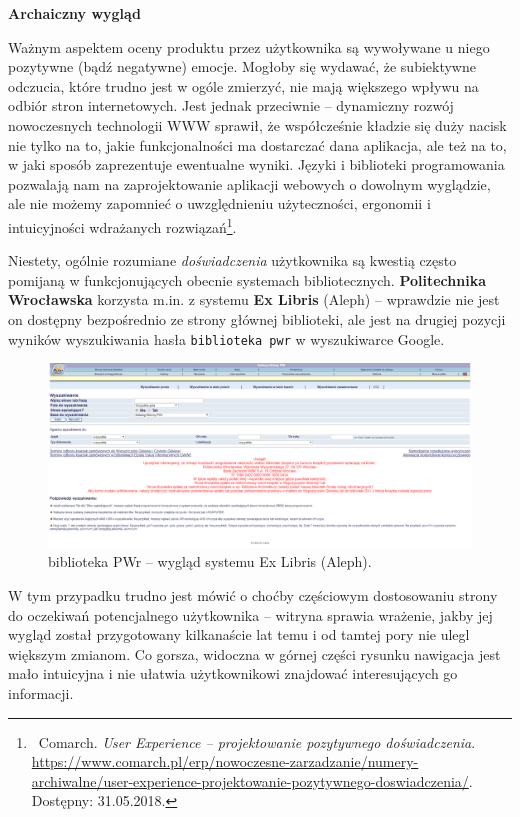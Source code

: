 \documentclass[12pt, a4paper]{article}
\begin{document}
\noindent\textbf{Archaiczny wygląd}\\\vspace{-0.35cm}

Ważnym aspektem oceny produktu przez użytkownika są wywoływane u niego pozytywne (bądź negatywne) emocje. Mogłoby się wydawać, że subiektywne odczucia, które trudno jest w ogóle zmierzyć, nie mają większego wpływu na odbiór stron internetowych. Jest jednak przeciwnie -- dynamiczny rozwój nowoczesnych technologii WWW sprawił, że współcześnie kładzie się duży nacisk nie tylko na to, jakie funkcjonalności ma dostarczać dana aplikacja, ale też na to, w jaki sposób zaprezentuje ewentualne wyniki. Języki i biblioteki programowania pozwalają nam na zaprojektowanie aplikacji webowych o dowolnym wyglądzie, ale nie możemy zapomnieć o uwzględnieniu użyteczności, ergonomii i intuicyjności wdrażanych rozwiązań\footnote{\ Comarch. \textit{User Experience -- projektowanie pozytywnego doświadczenia}.\\\url{https://www.comarch.pl/erp/nowoczesne-zarzadzanie/numery-archiwalne/user-experience-projektowanie-pozytywnego-doswiadczenia/}. Dostępny: 31.05.2018.}. 

Niestety, ogólnie rozumiane \textit{doświadczenia} użytkownika są kwestią często pomijaną w funkcjonujących obecnie systemach bibliotecznych. \textbf{Politechnika Wrocławska} korzysta m.in. z systemu \textbf{Ex Libris} (Aleph) -- wprawdzie nie jest on dostępny bezpośrednio ze strony głównej biblioteki, ale jest na drugiej pozycji wyników wyszukiwania hasła \texttt{biblioteka pwr} w wyszukiwarce Google.

\begin{figure}[h]
    \includegraphics[width=\textwidth]{img/aleph.png}
    \caption{biblioteka PWr -- wygląd systemu Ex Libris (Aleph).}
\end{figure}

W tym przypadku trudno jest mówić o choćby częściowym dostosowaniu strony do oczekiwań potencjalnego użytkownika -- witryna sprawia wrażenie, jakby jej wygląd został przygotowany kilkanaście lat temu i od tamtej pory nie ulegl większym zmianom. Co gorsza, widoczna w górnej części rysunku nawigacja jest mało intuicyjna i nie ułatwia użytkownikowi znajdować interesujących go informacji.\\
\end{document}
